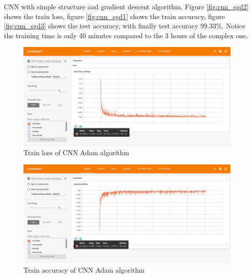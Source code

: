 \documentclass[10pt,twocolumn,letterpaper]{article}
\begin{document}
\begin{CJK}{UTF8}{gbsn}
CNN with simple structure and gradient descent algorithm. Figure \ref{fig:cnn_sgd2} shows the train loss, figure \ref{fig:cnn_sgd1} shows the train accuracy, figure \ref{fig:cnn_sgd3} shows the test accuracy, with finally test accuracy 99.33\%. Notice the training time is only 40 minutes compared to the 3 hours of the complex one.

\begin{figure}
\begin{center}
   \includegraphics[width=0.9\linewidth]{cnn_adam2.png}
\end{center}
\caption{Train loss of CNN Adam algorithm}
\label{fig:cnn_adam2}
\end{figure}

\begin{figure}
\begin{center}
   \includegraphics[width=0.9\linewidth]{cnn_adam1.png}
\end{center}
\caption{Train accuracy of CNN Adam algorithm}
\label{fig:cnn_adam1}
\end{figure}


\end{CJK}
\end{document}
